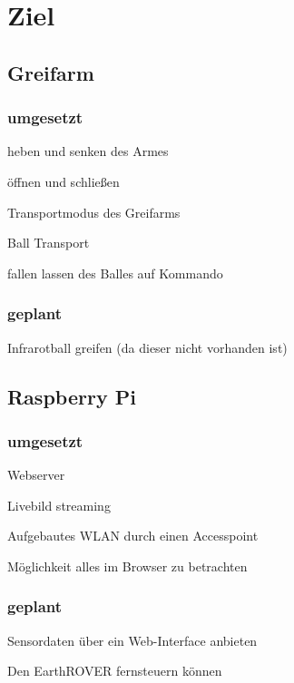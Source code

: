 \chapter{Ziel}

\section{Greifarm}
\subsection{umgesetzt}
\begin{capitemize}
	\item heben und senken des Armes
	\item öffnen und schließen
	\item Transportmodus des Greifarms
	\item Ball Transport
	\item fallen lassen des Balles auf Kommando
\end{capitemize}
\subsection{geplant}
\begin{capitemize}
	\item Infrarotball greifen (da dieser nicht vorhanden ist)
\end{capitemize}
\section{Raspberry Pi}
\subsection{umgesetzt}
\begin{capitemize}
	\item Webserver
	\item Livebild streaming
	\item Aufgebautes WLAN durch einen Accesspoint
	\item Möglichkeit alles im Browser zu betrachten
\end{capitemize}
\subsection{geplant}
\begin{capitemize}
	\item Sensordaten über ein Web-Interface anbieten
	\item Den EarthROVER fernsteuern können
\end{capitemize}